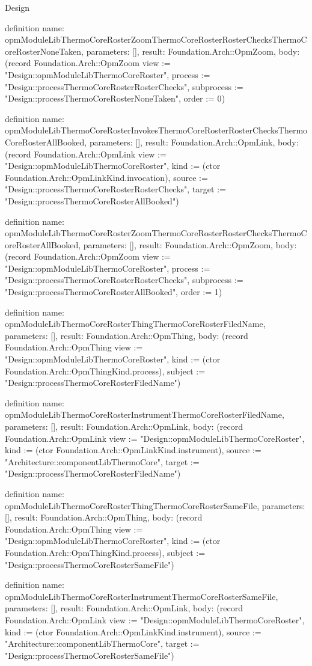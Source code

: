 \begin{lexlean}{Design}
\begin{semanticmodule}
definition{
  name: opmModuleLibThermoCoreRosterZoomThermoCoreRosterRosterChecksThermoCoreRosterNoneTaken,
  parameters: [],
  result: Foundation.Arch::OpmZoom,
  body: (record Foundation.Arch::OpmZoom {view := "Design::opmModuleLibThermoCoreRoster", process := "Design::processThermoCoreRosterRosterChecks", subprocess := "Design::processThermoCoreRosterNoneTaken", order := 0})
}

definition{
  name: opmModuleLibThermoCoreRosterInvokesThermoCoreRosterRosterChecksThermoCoreRosterAllBooked,
  parameters: [],
  result: Foundation.Arch::OpmLink,
  body: (record Foundation.Arch::OpmLink {view := "Design::opmModuleLibThermoCoreRoster", kind := (ctor Foundation.Arch::OpmLinkKind.invocation), source := "Design::processThermoCoreRosterRosterChecks", target := "Design::processThermoCoreRosterAllBooked"})
}

definition{
  name: opmModuleLibThermoCoreRosterZoomThermoCoreRosterRosterChecksThermoCoreRosterAllBooked,
  parameters: [],
  result: Foundation.Arch::OpmZoom,
  body: (record Foundation.Arch::OpmZoom {view := "Design::opmModuleLibThermoCoreRoster", process := "Design::processThermoCoreRosterRosterChecks", subprocess := "Design::processThermoCoreRosterAllBooked", order := 1})
}

definition{
  name: opmModuleLibThermoCoreRosterThingThermoCoreRosterFiledName,
  parameters: [],
  result: Foundation.Arch::OpmThing,
  body: (record Foundation.Arch::OpmThing {view := "Design::opmModuleLibThermoCoreRoster", kind := (ctor Foundation.Arch::OpmThingKind.process), subject := "Design::processThermoCoreRosterFiledName"})
}

definition{
  name: opmModuleLibThermoCoreRosterInstrumentThermoCoreRosterFiledName,
  parameters: [],
  result: Foundation.Arch::OpmLink,
  body: (record Foundation.Arch::OpmLink {view := "Design::opmModuleLibThermoCoreRoster", kind := (ctor Foundation.Arch::OpmLinkKind.instrument), source := "Architecture::componentLibThermoCore", target := "Design::processThermoCoreRosterFiledName"})
}

definition{
  name: opmModuleLibThermoCoreRosterThingThermoCoreRosterSameFile,
  parameters: [],
  result: Foundation.Arch::OpmThing,
  body: (record Foundation.Arch::OpmThing {view := "Design::opmModuleLibThermoCoreRoster", kind := (ctor Foundation.Arch::OpmThingKind.process), subject := "Design::processThermoCoreRosterSameFile"})
}

definition{
  name: opmModuleLibThermoCoreRosterInstrumentThermoCoreRosterSameFile,
  parameters: [],
  result: Foundation.Arch::OpmLink,
  body: (record Foundation.Arch::OpmLink {view := "Design::opmModuleLibThermoCoreRoster", kind := (ctor Foundation.Arch::OpmLinkKind.instrument), source := "Architecture::componentLibThermoCore", target := "Design::processThermoCoreRosterSameFile"})
}


\end{semanticmodule}
\end{lexlean}
